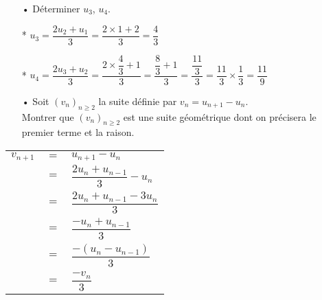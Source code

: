 \vspace*{.3cm}

\begin{itemize}
\item[•] Déterminer $u_3$, $u_4$. \\
\end{itemize}

\begin{itemize}
\item[*] $u_3 = \dfrac{2u_2 + u_1}{3} = \dfrac{2 \times 1 + 2}{3} = \dfrac{4}{3}$ \vspace*{.3cm} \\
\item[*] $u_4 = \dfrac{2u_3 + u_2}{3} = \dfrac{2 \times \dfrac{4}{3} + 1}{3} = \dfrac{\dfrac{8}{3} + 1}{3} = \dfrac{\dfrac{11}{3}}{3} = \dfrac{11}{3} \times \dfrac{1}{3} = \dfrac{11}{9}$ \vspace*{.3cm} \\
\end{itemize}

\vspace*{.3cm}

\begin{itemize}
\item[•] Soit $\left(v_n\right)_{n \geqslant 2}$ la suite définie par $v_n = u_{n+1} - u_n$. \\ Montrer que $\left(v_n\right)_{n \geqslant 2}$ est une suite géométrique dont on précisera le premier terme et la raison.
\end{itemize}

\vspace*{.3cm}

\begin{tabular}{lll}
$v_{n+1}$ & $=$ & $u_{n+1} - u_{n}$ \vspace*{.3cm} \\
& $=$ & $\dfrac{2u_n + u_{n-1}}{3} - u_n$ \vspace*{.3cm} \\
& $=$ & $\dfrac{2u_n + u_{n-1} - 3u_n}{3}$ \vspace*{.3cm} \\
& $=$ & $\dfrac{-u_n + u_{n-1}}{3}$ \vspace*{.3cm} \\
& $=$ & $\dfrac{-\left(u_n - u_{n-1}\right)}{3}$ \vspace*{.3cm} \\
& $=$ & $\dfrac{-v_n}{3}$ \vspace*{.3cm} \\
\end{tabular}

